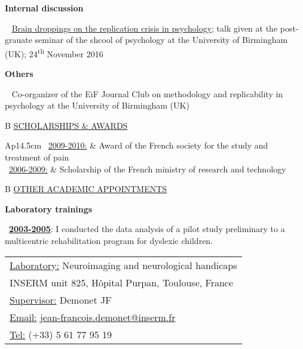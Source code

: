 \documentclass[a4paper,12pt,oneside]{letter}
\begin{document}
{\textbf{Internal discussion}

\textbullet~ \href{https://dx.doi.org/10.6084/m9.figshare.4257992.v1}{Brain droppings on the replication crisis in psychology}; talk given at the post-grauate seminar of the shcool of psychology at the University of Birmingham (UK); 24\textsuperscript{th} November 2016


\textbf{Others}

\textbullet~ Co-organizer of the EiF Journal Club on methodology and replicability in psychology at the University of Birmingham (UK)



\medskip 

\begin{tabular}{B}
\underline{SCHOLARSHIPS \& AWARDS}
\end{tabular}

\begin{tabular}{Ap{14.5cm}}
\textbullet~\underline{2009-2010:} & Award of the French society for the study and treatment of pain\\
     
\textbullet~\underline{2006-2009:} & Scholarship of the French ministry of research and technology \\
\end{tabular}



\medskip 

\begin{tabular}{B}
\underline{OTHER ACADEMIC APPOINTMENTS}
\end{tabular}

\begin{center}
\Large\textbf{Laboratory trainings}
\end{center}

\begin{minipage}[c]{7.7cm}
\textbullet~\underline{\textbf{2003-2005}}: I conducted the data analysis of a pilot study preliminary to a multicentric rehabilitation program for dyslexic children.
\end{minipage}
\hfill
\begin{minipage}[c]{10cm}
\setlength\minrowclearance{0.2cm}
\setlength\arrayrulewidth{1.5pt}
\small
\begin{tabular}[t]{|l|}\hline
\underline{Laboratory:} Neuroimaging and neurological handicaps\\
INSERM unit 825, Hôpital Purpan, Toulouse, France\\
\underline{Supervisor:} Demonet JF\\
\underline{Email:} \href{mailto:jean-francois.demonet@inserm.fr}{jean-francois.demonet@inserm.fr}\\
\underline{Tel:} (+33) 5 61 77 95 19 \\ \hline
\end{tabular}
\end{minipage}

}
\end{document}
